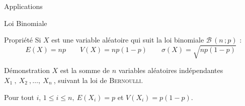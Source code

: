 \documentclass{coursbook}
\begin{document}
    \vfill
    \begin{Gpartie}{Applications} 
        \begin{Spartie}{Loi Binomiale} 
            \begin{SSpartie}{Propriété} 
                Si $X$ est une variable aléatoire qui suit la loi binomiale $\mathcal{B}\,\left(n\,; p\right)$ : \[E(X)=np\qquad V(X)=np\left(1-p\right)\qquad\sigma(X)=\sqrt{np\left(1-p\right)}\]
                \begin{SSSpartie}{Démonstration} 
                    $X$ est la somme de $n$ variables aléatoires indépendantes $X_1~,~X_2~,\dotsc,~X_n~$, suivant la loi de \textsc{Bernoulli}.

                    Pour tout $i$, $1\leq i\leq n,~E\left(X_i\right)=p$ et $V\left(X_i\right)=p\left(1-p\right)$.


\end{SSSpartie}
\end{SSpartie}
\end{Spartie}
\end{Gpartie}
\end{document}
